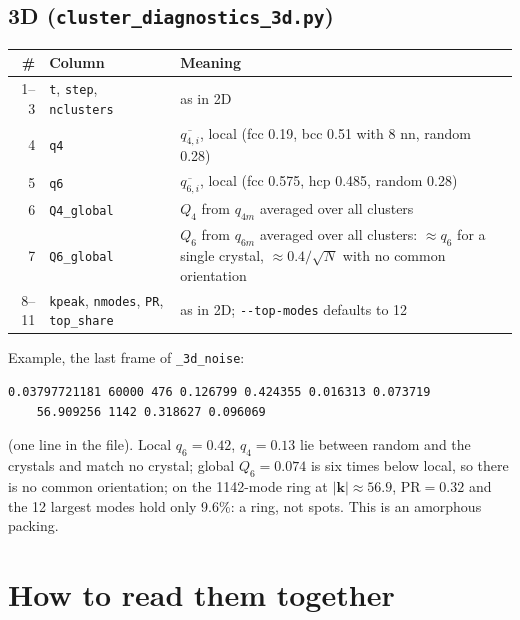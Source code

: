 \documentclass[11pt]{article}
\newcommand{\code}[1]{\texttt{#1}}
\begin{document}
\subsection*{3D (\code{cluster\_diagnostics\_3d.py})}
\begin{center}
\begin{tabularx}{\textwidth}{@{}r l L@{}}
\toprule
\# & Column & Meaning \\
--3 & \code{t}, \code{step}, \code{nclusters} & as in 2D \\
4 & \code{q4} & $\overline{q_{4,i}}$, local (fcc 0.19, bcc 0.51 with 8 nn, random 0.28) \\
5 & \code{q6} & $\overline{q_{6,i}}$, local (fcc 0.575, hcp 0.485, random 0.28) \\
6 & \code{Q4\_global} & $Q_4$ from $q_{4m}$ averaged over all clusters \\
7 & \code{Q6\_global} & $Q_6$ from $q_{6m}$ averaged over all clusters: $\approx q_6$ for a single crystal, $\approx0.4/\sqrt N$ with no common orientation \\
8--11 & \code{kpeak}, \code{nmodes}, \code{PR}, \code{top\_share} & as in 2D; \code{-{}-top-modes} defaults to 12 \\
\bottomrule
\end{tabularx}
\end{center}
Example, the last frame of \code{\_3d\_noise}:
\begin{verbatim}
0.03797721181 60000 476 0.126799 0.424355 0.016313 0.073719
    56.909256 1142 0.318627 0.096069
\end{verbatim}
(one line in the file). Local $q_6=0.42$, $q_4=0.13$ lie between random and the
crystals and match no crystal; global $Q_6=0.074$ is six times below local, so
there is no common orientation; on the 1142-mode ring at
$|\mathbf k|\approx56.9$, $\mathrm{PR}=0.32$ and the 12 largest modes hold only
9.6\%: a ring, not spots. This is an amorphous packing.

\section{How to read them together}
\end{document}
